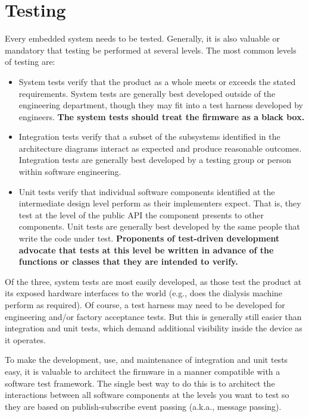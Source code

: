 \section{Testing}

Every embedded system needs to be tested. Generally, it is also valuable or mandatory that testing be performed at several levels. The most common levels of testing are:

\begin{itemize}
    \item System tests verify that the product as a whole meets or exceeds the stated requirements. System tests are generally best developed outside of the engineering department, though they may fit into a test harness developed by engineers. \textbf{The system tests should treat the firmware as a black box.}
    
    \item Integration tests verify that a subset of the subsystems identified in the architecture diagrams interact as expected and produce reasonable outcomes. Integration tests are generally best developed by a testing group or person within software engineering.
    
    \item Unit tests verify that individual software components identified at the intermediate design level perform as their implementers expect. That is, they test at the level of the public API the component presents to other components. Unit tests are generally best developed by the same people that write the code under test. \textbf{Proponents of test-driven development advocate that tests at this level be written in advance of the functions or classes that they are intended to verify.}
\end{itemize}

Of the three, system tests are most easily developed, as those test the product at its exposed hardware interfaces to the world (e.g., does the dialysis machine perform as required). Of course, a test harness may need to be developed for engineering and/or factory acceptance tests. But this is generally still easier than integration and unit tests, which demand additional visibility inside the device as it operates.

To make the development, use, and maintenance of integration and unit tests easy, it is valuable to architect the firmware in a manner compatible with a software test framework. The single best way to do this is to architect the interactions between all software components at the levels you want to test so they are based on publish-subscribe event passing (a.k.a., message passing).

